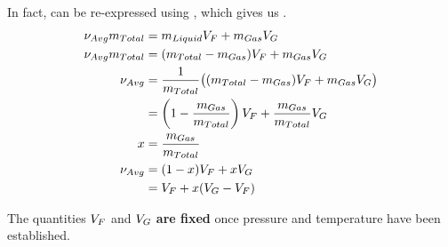 In fact,  can be re-expressed using , which gives us .
\begin{align*}
  \nu_{Avg} m_{Total} &= m_{Liquid} V_{F} + m_{Gas} V_{G} \\
  \nu_{Avg} m_{Total} &= (m_{Total} - m_{Gas}) V_{F} + m_{Gas} V_{G} \\
  \nu_{Avg} &= \frac{1}{m_{Total}} \bigl( (m_{Total} - m_{Gas}) V_{F} + m_{Gas} V_{G} \bigr) \\
                                &= \left( 1 - \frac{m_{Gas}}{m_{Total}} \right) V_{F} + \frac{m_{Gas}}{m_{Total}} V_{G} \\
  x &= \frac{m_{Gas}}{m_{Total}} \\
  \nu_{Avg} &= (1 - x) V_{F} + x V_{G} \\
  &= V_{F} + x (V_{G} - V_{F})
\end{align*}

The quantities $V_{F}$ and $V_{G}$ \textbf{are fixed} once pressure and temperature have been established.

